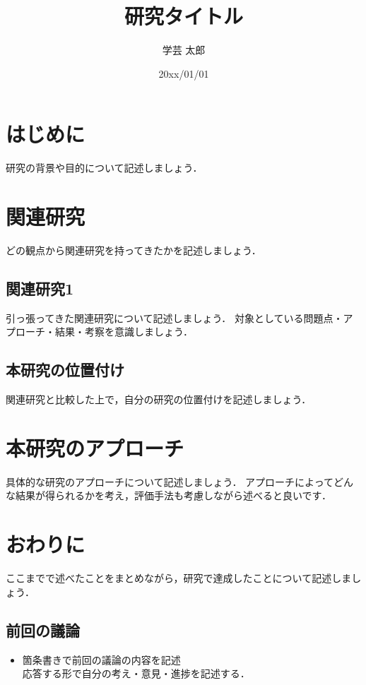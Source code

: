 \documentclass[dvipdfmx]{doc}
\title{研究タイトル} %
\affiliation{櫨山研究室}
\author{ 学芸 太郎} %
\date{20xx/01/01} %
\begin{document}
\maketitle

\section{はじめに}

研究の背景や目的について記述しましょう．

\section{関連研究}

どの観点から関連研究を持ってきたかを記述しましょう．

\subsection{関連研究1}

引っ張ってきた関連研究について記述しましょう．
対象としている問題点・アプローチ・結果・考察を意識しましょう．

\subsection{本研究の位置付け}

関連研究と比較した上で，自分の研究の位置付けを記述しましょう．

\section{本研究のアプローチ}

具体的な研究のアプローチについて記述しましょう．
アプローチによってどんな結果が得られるかを考え，評価手法も考慮しながら述べると良いです．

\section{おわりに}

ここまでで述べたことをまとめながら，研究で達成したことについて記述しましょう．

\begin{thebibliography}{10}
\end{thebibliography}

\subsection*{前回の議論}
\begin{itemize}
    \item 箇条書きで前回の議論の内容を記述 \\
    応答する形で自分の考え・意見・進捗を記述する．
\end{itemize}
\end{document}
